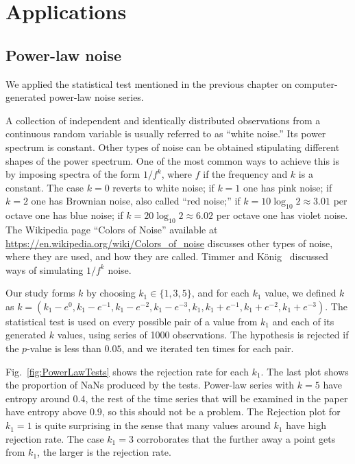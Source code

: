 \chapter{Applications}
\section{Power-law noise}

We applied the statistical test mentioned in the previous chapter on computer-generated power-law noise series.

A collection of independent and identically distributed observations from a continuous random variable is usually referred to as ``white noise.''
Its power spectrum is constant.
Other types of noise can be obtained stipulating different shapes of the power spectrum.
One of the most common ways to achieve this is by imposing spectra of the form $1/f^k$, where $f$ if the frequency and $k$ is a constant.
The case $k=0$ reverts to white noise;
if $k=1$ one has pink noise;
if $k=2$ one has Brownian noise, also called ``red noise;''
if $k=10\log_{10}2\approx 3.01$ per octave one has blue noise;
if $k=20\log_{10}2\approx 6.02$ per octave one has violet noise.
The Wikipedia page ``Colors of Noise'' available at \url{https://en.wikipedia.org/wiki/Colors_of_noise} discusses other types of noise, where they are used, and how they are called.
Timmer and König~\cite{Timmer1995} discussed ways of simulating $1/f^k$ noise.

Our study forms $k$ by choosing
$k_1\in\{1,3,5\}$, and for each $k_1$ value, we defined $k$ as $k=(k_1-e^0,k_1-e^{-1},k_1-e^{-2},k_1-e^{-3},k_1,k_1+e^{-1},k_1+e^{-2},k_1+e^{-3})$. 
The statistical test is used on every possible pair of a value from $k_1$ and each of its generated $k$ values, using series of \num{1000} observations. 
The hypothesis is rejected if the $p$-value is less than $0.05$, and we iterated ten times for each pair. 

Fig.~\ref{fig:PowerLawTests} shows the rejection rate for each $k_1$. 
The last plot shows the proportion of NaNs produced by the tests.
Power-law series with $k=5$ have entropy around $0.4$, the rest of the time series that will be examined in the paper have entropy above $0.9$, so this should not be a problem. 
The Rejection plot for $k_1=1$ is quite surprising in the sense that many values around $k_1$ have high rejection rate. 
The case $k_1=3$ corroborates that the further away a point gets from $k_1$, the larger is the rejection rate.

